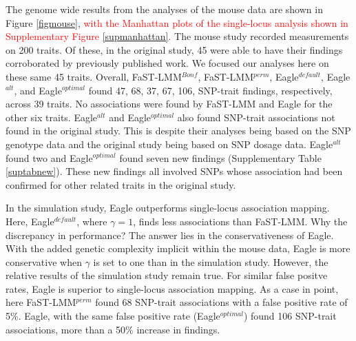 \documentclass{article}
\begin{document}
  
The genome wide results from the analyses of the mouse data are shown in Figure  \ref{figmouse}, 
\textcolor{red}{
with the Manhattan plots of the 
single-locus analysis shown in Supplementary Figure \ref{supmanhattan}.} 
The mouse study recorded
measurements on 200 traits. Of these, in the original study, 45 were able to have their findings  corroborated by previously published work. We focused 
our analyses here on these same 45 traits. Overall,  FaST-LMM$^{Bonf}$,  FaST-LMM$^{perm}$, Eagle$^{default}$, Eagle$^{alt}$, and Eagle$^{optimal}$ found 47, 68, 37, 67, 106, SNP-trait findings, respectively, across 39 traits. No associations were found by FaST-LMM and Eagle for the other six traits. 
Eagle$^{alt}$ and Eagle$^{optimal}$ also found SNP-trait associations not found in the original study. This is despite their analyses being based 
on the SNP genotype data and the original study being based on SNP dosage data. Eagle$^{alt}$ found two  and 
Eagle$^{optimal}$ found seven new findings (Supplementary Table \ref{suptabnew}).  These new findings all involved SNPs whose association had been confirmed for other related traits in the original 
study. 

In the simulation study, Eagle outperforms single-locus association mapping. Here, Eagle$^{default}$, where $\gamma=1$, finds less associations 
than FaST-LMM. Why the discrepancy in performance?   The answer lies in the conservativeness of Eagle.  With the added genetic complexity implicit within the mouse data, Eagle is more conservative when $\gamma$ is set to one than in the simulation study.  However, the relative results of the simulation study remain true. For similar false positve rates, Eagle is superior to single-locus association mapping. As a case in point, here FaST-LMM$^{perm}$ found 68 SNP-trait associations with a false positive rate of 5\%. Eagle, with the same false positive rate (Eagle$^{optimal}$) found 106 SNP-trait associations, more 
than a 50\% increase in findings. 
\end{document}
